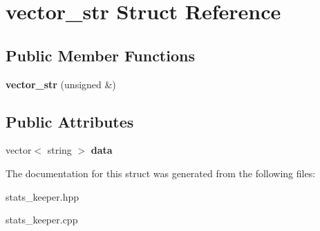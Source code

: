 \hypertarget{structvector__str}{
\section{vector\_\-str Struct Reference}
\label{structvector__str}
}
\subsection*{Public Member Functions}
\begin{DoxyCompactItemize}
\item 
\hypertarget{structvector__str_a28076fa6304df49069de0e85b97fb4a1}{
{\bfseries vector\_\-str} (unsigned \&)}
\label{structvector__str_a28076fa6304df49069de0e85b97fb4a1}

\end{DoxyCompactItemize}
\subsection*{Public Attributes}
\begin{DoxyCompactItemize}
\item 
\hypertarget{structvector__str_afb2af99138c3d63647372c4a292f4123}{
vector$<$ string $>$ {\bfseries data}}
\label{structvector__str_afb2af99138c3d63647372c4a292f4123}

\end{DoxyCompactItemize}


The documentation for this struct was generated from the following files:\begin{DoxyCompactItemize}
\item 
stats\_\-keeper.hpp\item 
stats\_\-keeper.cpp\end{DoxyCompactItemize}
